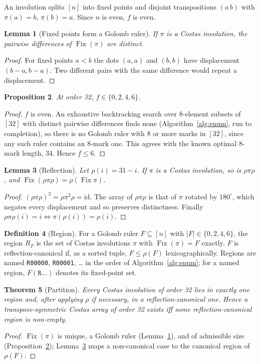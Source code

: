 \documentclass[11pt,a4paper]{article}
\newtheorem{theorem}{Theorem}
\newtheorem{lemma}[theorem]{Lemma}
\newtheorem{proposition}[theorem]{Proposition}
\theoremstyle{definition}
\newtheorem{definition}[theorem]{Definition}
\newcommand{\Fix}{\operatorname{Fix}}
\newcommand{\code}[1]{\texttt{#1}}
\begin{document}
An involution splits $[n]$ into fixed points and disjoint transpositions $(a\,b)$ with
$\pi(a)=b$, $\pi(b)=a$. Since $n$ is even, $f$ is even.

\begin{lemma}[Fixed points form a Golomb ruler]\label{lem:golomb}
If $\pi$ is a Costas involution, the pairwise differences of $\Fix(\pi)$ are distinct.
\end{lemma}
\begin{proof}
For fixed points $a<b$ the dots $(a,a)$ and $(b,b)$ have displacement $(b-a,b-a)$. Two
different pairs with the same difference would repeat a displacement.
\end{proof}

\begin{proposition}\label{prop:f}
At order 32, $f\in\{0,2,4,6\}$.
\end{proposition}
\begin{proof}
$f$ is even. An exhaustive backtracking search over 8-element subsets of $[32]$ with
distinct pairwise differences finds none (Algorithm~\ref{alg:enum}, run to completion), so
there is no Golomb ruler with 8 or more marks in $[32]$, since any such ruler contains an
8-mark one. This agrees with the known optimal 8-mark length, 34. Hence $f\le 6$.
\end{proof}

\begin{lemma}[Reflection]\label{lem:refl}
Let $\rho(i)=31-i$. If $\pi$ is a Costas involution, so is $\rho\pi\rho$, and
$\Fix(\rho\pi\rho)=\rho(\Fix\pi)$.
\end{lemma}
\begin{proof}
$(\rho\pi\rho)^2=\rho\pi^2\rho=\mathrm{id}$. The array of $\rho\pi\rho$ is that of $\pi$
rotated by $180^\circ$, which negates every displacement and so preserves distinctness.
Finally $\rho\pi\rho(i)=i\iff\pi(\rho(i))=\rho(i)$.
\end{proof}

\begin{definition}[Region]
For a Golomb ruler $F\subseteq[n]$ with $|F|\in\{0,2,4,6\}$, the region $R_F$ is the set of
Costas involutions $\pi$ with $\Fix(\pi)=F$ exactly. $F$ is reflection-canonical if,
as a sorted tuple, $F\le\rho(F)$ lexicographically. Regions are named \code{R00000},
\code{R00001}, \dots{} in the order of Algorithm~\ref{alg:enum}; for a named region,
$F(\code{R}\ldots)$ denotes its fixed-point set.
\end{definition}

\begin{theorem}[Partition]\label{thm:partition}
Every Costas involution of order 32 lies in exactly one region and, after applying $\rho$ if
necessary, in a reflection-canonical one. Hence a transpose-symmetric Costas array of order
32 exists iff some reflection-canonical region is non-empty.
\end{theorem}
\begin{proof}
$\Fix(\pi)$ is unique, a Golomb ruler (Lemma~\ref{lem:golomb}), and of admissible size
(Proposition~\ref{prop:f}); Lemma~\ref{lem:refl} maps a non-canonical case to the canonical
region of $\rho(F)$.
\end{proof}
\end{document}
